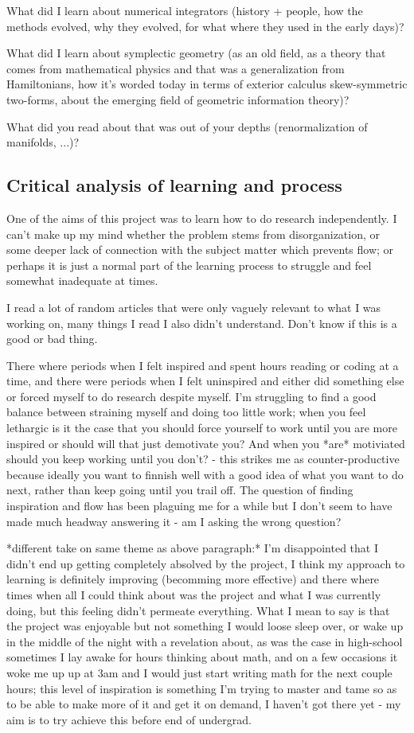 \documentclass[12pt]{article}
\begin{document}
What did I learn about numerical integrators (history + people, how the methods evolved, why they evolved, for what where they used in the early days)?

What did I learn about symplectic geometry (as an old field, as a theory that comes from mathematical physics and that was a generalization from Hamiltonians, how it's worded today in terms of exterior calculus skew-symmetric two-forms, about the emerging field of geometric information theory)?

What did you read about that was out of your depths (renormalization of manifolds, ...)?

\subsection{Critical analysis of learning and process}
One of the aims of this project was to learn how to do research independently. I can't make up my mind whether the problem stems from disorganization, or some deeper lack of connection with the subject matter which prevents flow; or perhaps it is just a normal part of the learning process to struggle and feel somewhat inadequate at times.

I read a lot of random articles that were only vaguely relevant to what I was working on, many things I read I also didn't understand. Don't know if this is a good or bad thing.

There where periods when I felt inspired and spent hours reading or coding at a time, and there were periods when I felt uninspired and either did something else or forced myself to do research despite myself. I'm struggling to find a good balance between straining myself and doing too little work; when you feel lethargic is it the case that you should force yourself to work until you are more inspired or should will that just demotivate you? And when you *are* motiviated should you keep working until you don't? - this strikes me as counter-productive because ideally you want to finnish well with a good idea of what you want to do next, rather than keep going until you trail off. The question of finding inspiration and flow has been plaguing me for a while but I don't seem to have made much headway answering it - am I asking the wrong question?

*different take on same theme as above paragraph:* 
I'm disappointed that I didn't end up getting completely absolved by the project, I think my approach to learning is definitely improving (becomming more effective) and there where times when all I could think about was the project and what I was currently doing, but this feeling didn't permeate everything. What I mean to say is that the project was enjoyable but not something I would loose sleep over, or wake up in the middle of the night with a revelation about, as was the case in high-school sometimes I lay awake for hours thinking about math, and on a few occasions it woke me up up at 3am and I would just start writing math for the next couple hours; this level of inspiration is something I'm trying to master and tame so as to be able to make more of it and get it on demand, I haven't got there yet - my aim is to try achieve this before end of undergrad. 
\end{document}

